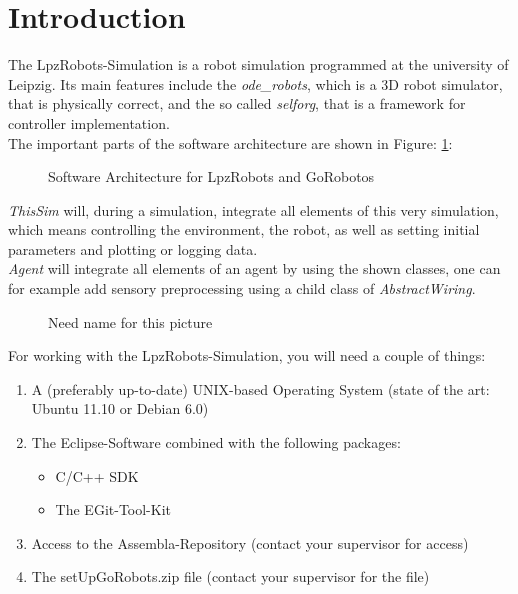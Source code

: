 \section{Introduction}

The LpzRobots-Simulation is a robot simulation programmed at the university of Leipzig. Its main features
include the \emph{ode\_robots}, which is a 3D robot simulator, that is physically correct, and the so called
\emph{selforg}, that is a framework for controller implementation. \\
The important parts of the software architecture are shown in Figure: \ref{architecture}: \\
\begin{center}
\begin{figure}[h!]
 \caption{Software Architecture for LpzRobots and GoRobotos}
 \label{architecture}
\end{figure}
\end{center}
\emph{ThisSim} will, during a simulation, integrate all elements of this very simulation, which means controlling
the environment, the robot, as well as setting initial parameters and plotting or logging data. \\
\emph{Agent} will integrate all elements of an agent by using the shown classes, one can for example add sensory preprocessing
using a child class of \emph{AbstractWiring}. \newline
\begin{center}
  \begin{figure}[h!]
    
\caption{Need name for this picture}
  \end{figure}


\end{center}
\newpage
For working with the LpzRobots-Simulation, you will need a couple of things:
\begin{enumerate}
 \item A (preferably up-to-date) UNIX-based Operating System (state of the art: Ubuntu 11.10 or Debian 6.0)
 \item The Eclipse-Software combined with the following packages:
      \begin{itemize}
       \item C/C++ SDK
       \item The EGit-Tool-Kit
      \end{itemize}
 \item Access to the Assembla-Repository (contact your supervisor for access)
 \item The setUpGoRobots.zip file (contact your supervisor for the file)
\end{enumerate}